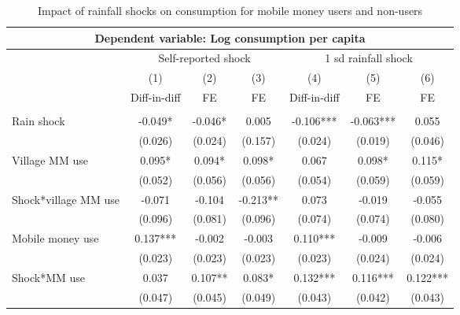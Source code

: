\begin{table}
\begin{adjustwidth}{-1in}{-1in} 
  \centering
  \caption{Impact of rainfall shocks on consumption for mobile money users and non-users} \label{MM spill}
\begin{tabular}{lcccccc}
\multicolumn{7}{c}{Dependent variable: Log consumption per capita} \\\hline
& \multicolumn{3}{c}{ Self-reported shock} & \multicolumn{3}{c}{1 sd rainfall shock} \\ \cmidrule(r){2-4} \cmidrule(l){5-7}
 & (1) & (2) & (3)  & (4) & (5) & (6)  \\

  & Diff-in-diff & FE & FE & Diff-in-diff & FE & FE \\ \hline
 &  &  &  &  &  &  \\
Rain shock & -0.049* & -0.046* & 0.005   & -0.106*** & -0.063*** & 0.055 \\
  & (0.026) & (0.024) & (0.157) & (0.024) & (0.019) & (0.046) \\
Village MM use  & 0.095* & 0.094* & 0.098*& 0.067 & 0.098* & 0.115* \\
 & (0.052) & (0.056) & (0.056)  & (0.054) & (0.059) & (0.059)  \\
Shock*village MM use & -0.071 & -0.104 & -0.213** & 0.073 & -0.019 & -0.055  \\
& (0.096) & (0.081) & (0.096)  & (0.074) & (0.074) & (0.080)   \\
Mobile money use & 0.137*** & -0.002 & -0.003 & 0.110*** & -0.009 & -0.006 \\
 & (0.023) & (0.023) & (0.023) & (0.023) & (0.024) & (0.024) \\
Shock*MM use   & 0.037 & 0.107** & 0.083*  & 0.132*** & 0.116*** & 0.122*** \\
 & (0.047) & (0.045) & (0.049) & (0.043) & (0.042) & (0.043) \\


\end{tabular}
\end{adjustwidth}
\end{table}
